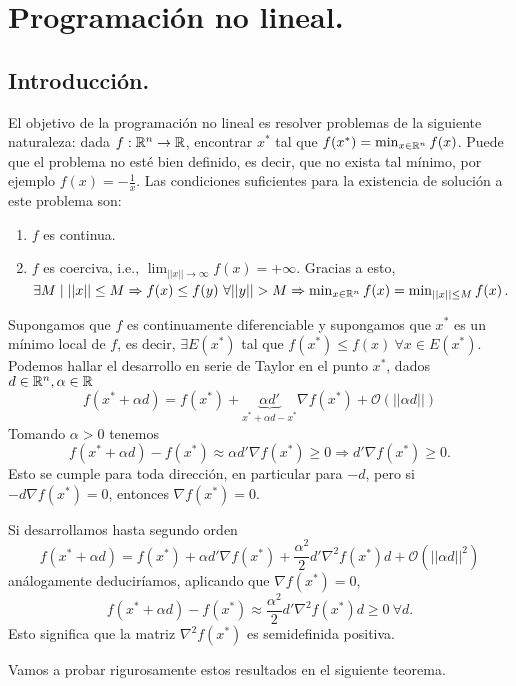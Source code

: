 \documentclass[MIOP.tex]{subfiles}
\begin{document}
\chapter{Programación no lineal.}

\section{Introducción.}

El objetivo de la programación no lineal es resolver problemas de la siguiente naturaleza: dada $f:\mathbb{R}^n\to\mathbb{R}$, encontrar $x^*$ tal que $f(x^*)=\min_{x\in\mathbb{R}^n}f(x)$. Puede que el problema no esté bien definido, es decir, que no exista tal mínimo, por ejemplo $f(x)=-\frac{1}{x}$. Las condiciones suficientes para la existencia de solución a este problema son:
\begin{enumerate}
\item $f$ es continua.
\item $f$ es coerciva, i.e., $\lim_{||x||\to\infty} f(x)=+\infty$. Gracias a esto, $\exists M\mid ||x||\leq M\Rightarrow f(x)\leq f(y)\ \forall ||y||>M\Rightarrow \min_{x\in\R^n}f(x)=\min_{||x||\leq M}f(x)$.
\end{enumerate}
Supongamos que $f$ es continuamente diferenciable y supongamos que $x^*$ es un mínimo local de $f$, es decir, $\exists E(x^*)$ tal que $f(x^*)\leq f(x)\ \forall x\in E(x^*)$. Podemos hallar el desarrollo en serie de Taylor en el punto $x^*$, dados $d\in\mathbb{R}^n,\alpha\in\mathbb{R}$
$$f(x^*+\alpha d)=f(x^*)+\underbrace{\alpha d'}_{x^*+\alpha d-x^*}\nabla f(x^*)+\mathcal{O}(||\alpha d||)$$
Tomando $\alpha>0$ tenemos
$$f(x^*+\alpha d)-f(x^*)\approx \alpha d'\nabla f(x^*)\geq 0\Rightarrow d'\nabla f(x^*)\geq 0.$$
Esto se cumple para toda dirección, en particular para $-d$, pero si $-d\nabla f(x^*)=0$, entonces $\nabla f(x^*)=0$. 

Si desarrollamos hasta segundo orden
$$f(x^*+\alpha d)=f(x^*)+\alpha d'\nabla f(x^*)+\frac{\alpha^2}{2}d'\nabla^2 f(x^*)d+\mathcal{O}(||\alpha d||^2)$$
análogamente deduciríamos, aplicando que $\nabla f(x^*)=0$, 
$$f(x^*+\alpha d)-f(x^*)\approx \frac{\alpha^2}{2}d'\nabla^2 f(x^*)d\geq 0\ \forall d.$$
Esto significa que la matriz $\nabla^2 f(x^*)$ es semidefinida positiva.

Vamos a probar rigurosamente estos resultados en el siguiente teorema.
\end{document}

